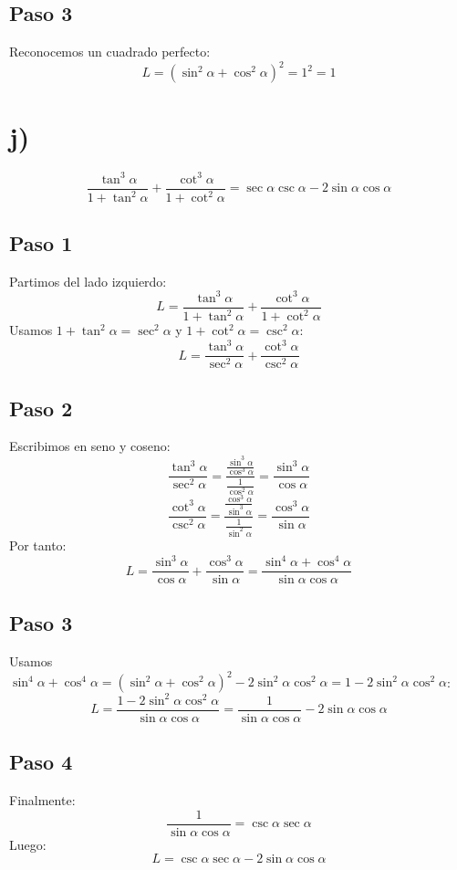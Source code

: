 \documentclass[12pt,a4paper]{article}
\begin{document}
\subsection*{Paso 3}
Reconocemos un cuadrado perfecto:
\[
L = (\sin^2\alpha + \cos^2\alpha)^2 = 1^2 = 1
\]

\newpage
\section*{j)}

\begin{identidad}
\[
\frac{\tan^3\alpha}{1+\tan^2\alpha}
+
\frac{\cot^3\alpha}{1+\cot^2\alpha}
=
\sec\alpha\csc\alpha-2\sin\alpha\cos\alpha
\]
\end{identidad}

\subsection*{Paso 1}
Partimos del lado izquierdo:
\[
L = \frac{\tan^3\alpha}{1+\tan^2\alpha} + \frac{\cot^3\alpha}{1+\cot^2\alpha}
\]
Usamos \(1+\tan^2\alpha = \sec^2\alpha\) y \(1+\cot^2\alpha = \csc^2\alpha\):
\[
L = \frac{\tan^3\alpha}{\sec^2\alpha} + \frac{\cot^3\alpha}{\csc^2\alpha}
\]

\subsection*{Paso 2}
Escribimos en seno y coseno:
\[
\frac{\tan^3\alpha}{\sec^2\alpha} = \frac{\frac{\sin^3\alpha}{\cos^3\alpha}}{\frac1{\cos^2\alpha}} = \frac{\sin^3\alpha}{\cos\alpha}
\]
\[
\frac{\cot^3\alpha}{\csc^2\alpha} = \frac{\frac{\cos^3\alpha}{\sin^3\alpha}}{\frac1{\sin^2\alpha}} = \frac{\cos^3\alpha}{\sin\alpha}
\]
Por tanto:
\[
L = \frac{\sin^3\alpha}{\cos\alpha} + \frac{\cos^3\alpha}{\sin\alpha}
= \frac{\sin^4\alpha + \cos^4\alpha}{\sin\alpha\cos\alpha}
\]

\subsection*{Paso 3}
Usamos \(\sin^4\alpha+\cos^4\alpha = (\sin^2\alpha+\cos^2\alpha)^2 - 2\sin^2\alpha\cos^2\alpha = 1 - 2\sin^2\alpha\cos^2\alpha\):
\[
L = \frac{1 - 2\sin^2\alpha\cos^2\alpha}{\sin\alpha\cos\alpha}
= \frac{1}{\sin\alpha\cos\alpha} - 2\sin\alpha\cos\alpha
\]

\subsection*{Paso 4}
Finalmente:
\[
\frac{1}{\sin\alpha\cos\alpha} = \csc\alpha\sec\alpha
\]
Luego:
\[
L = \csc\alpha\sec\alpha - 2\sin\alpha\cos\alpha
\]
\end{document}
